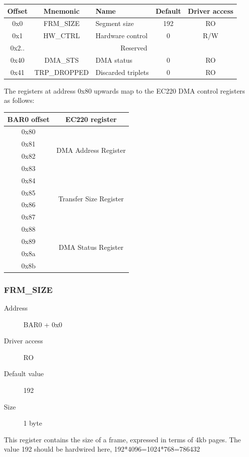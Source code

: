 \documentclass[12pt]{article}
\begin{document}
\begin{tabular}{|c|c|l|c|c|} \hline
\textbf{Offset} & \textbf{Mnemonic} & \textbf{Name} & \textbf{Default} & \textbf{Driver access} \\ \hline
0x0 & FRM\_SIZE & Segment size & 192 & RO \\ \hline
0x1 & HW\_CTRL & Hardware control & 0 & R/W \\ \hline
0x2.. & \multicolumn{4}{|c|}{Reserved} \\ \hline
0x40 & DMA\_STS & DMA status & 0 & RO \\ \hline
0x41 & TRP\_DROPPED & Discarded triplets & 0 & RO \\ \hline
\end{tabular}

The registers at address 0x80 upwards map to the EC220 DMA control registers
as follows:

\begin{tabular}{|c|c|} \hline
\textbf{BAR0 offset} & \textbf{EC220 register} \\ \hline
0x80 & \multirow{4}{*}{DMA Address Register} \\
0x81 & \\
0x82 & \\
0x83 & \\ \hline
0x84 & \multirow{4}{*}{Transfer Size Register} \\
0x85 & \\
0x86 & \\
0x87 & \\ \hline
0x88 & \multirow{4}{*}{DMA Status Register} \\
0x89 & \\
0x8a & \\
0x8b & \\ \hline
\end{tabular}

\subsubsection{FRM\_SIZE}

\begin{description}
\item[Address] BAR0 + 0x0
\item[Driver access] RO
\item[Default value] 192
\item[Size] 1 byte
\end{description}

This register contains the size of a frame, expressed in terms of 4kb pages. The value 192 should be hardwired here, 192*4096=1024*768=786432
\end{document}
